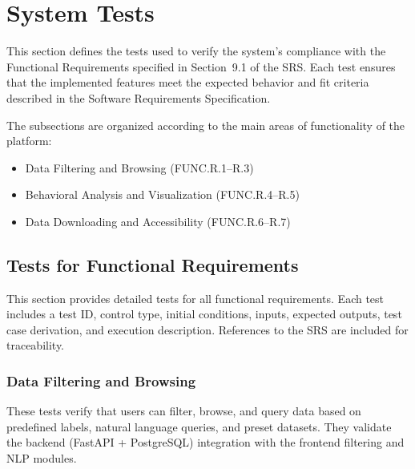 \documentclass[12pt, titlepage]{article}
\begin{document}
\label{sec:system_tests}
\section{System Tests}

This section defines the tests used to verify the system’s compliance with the
Functional Requirements specified in Section~9.1 of the SRS. Each test ensures
that the implemented features meet the expected behavior and fit criteria
described in the Software Requirements Specification. 

The subsections are organized according to the main areas of functionality of
the platform:
\begin{itemize}
    \item Data Filtering and Browsing (FUNC.R.1--R.3)
    \item Behavioral Analysis and Visualization (FUNC.R.4--R.5)
    \item Data Downloading and Accessibility (FUNC.R.6--R.7)
\end{itemize}

\subsection{Tests for Functional Requirements}

This section provides detailed tests for all functional requirements. Each test
includes a test ID, control type, initial conditions, inputs, expected outputs,
test case derivation, and execution description. References to the SRS are
included for traceability. 

\subsubsection{Data Filtering and Browsing}

These tests verify that users can filter, browse, and query data based on
predefined labels, natural language queries, and preset datasets. They validate
the backend (FastAPI + PostgreSQL) integration with the frontend filtering and
NLP modules.
\end{document}

